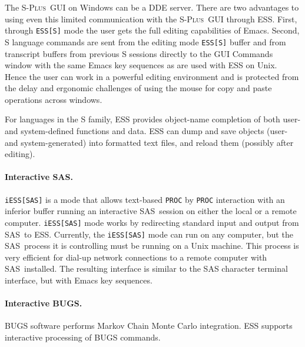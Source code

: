 \documentclass{article}
\newcommand*{\SAS}{\textsc{SAS}}
\newcommand*{\Splus}{\textsc{S-Plus}}
\newcommand{\stexttt}[1]{{\small\texttt{#1}}}
\begin{document}
The \Splus\ GUI on Windows can be a DDE server.  There are two
advantages to using even this limited communication with the \Splus\
GUI through ESS.  First, through \stexttt{ESS[S]} mode the user gets
the full editing capabilities of Emacs.  Second, S language commands
are sent from the editing mode \stexttt{ESS[S]} buffer and from
transcript buffers from previous S sessions directly to the GUI
Commands window with the same Emacs key sequences as are used with ESS
on Unix.  Hence the user can work in a powerful editing environment
and is protected from the delay and ergonomic challenges of using the
mouse for copy and paste operations across windows.

For languages in the S family, ESS provides object-name completion of
both user- and system-defined functions and data.  ESS can dump and
save objects (user- and system-generated) into formatted text files,
and reload them (possibly after editing).

\paragraph{Interactive \SAS.}
\stexttt{iESS[SAS]} is a mode that allows text-based \stexttt{PROC} by
\stexttt{PROC} interaction with an inferior buffer running an
interactive \SAS\ session on either the local or a remote computer.
\stexttt{iESS[SAS]} mode works by redirecting standard input and
output from \SAS\ to ESS.  Currently, the \stexttt{iESS[SAS]} mode can
run on any computer, but the \SAS\ process it is controlling must be
running on a Unix machine.  This process is very efficient for dial-up
network connections to a remote computer with \SAS\ installed.  The
resulting interface is similar to the SAS character terminal
interface, but with Emacs key sequences.

\paragraph{Interactive BUGS.}
BUGS software performs Markov Chain Monte Carlo integration.  ESS
supports interactive processing of BUGS commands.

\end{document}
